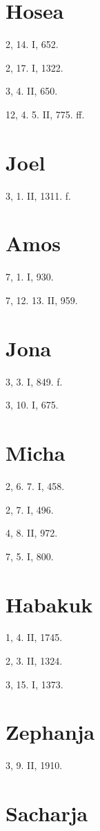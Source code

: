 \section{Hosea}

2, 14. I, 652.

2, 17. I, 1322.

3, 4. II, 650.

12, 4. 5. II, 775. ff.

\section{Joel}

3, 1. II, 1311. f.

\section{Amos}

7, 1. I, 930.

7, 12. 13. II, 959.

\section{Jona}

3, 3. I, 849. f.

3, 10. I, 675.

\section{Micha}

2, 6. 7. I, 458.

2, 7. I, 496.

4, 8. II, 972.

7, 5. I, 800.

\section{Habakuk}

1, 4. II, 1745.

2, 3. II, 1324.

3, 15. I, 1373.

\section{Zephanja}

3, 9. II, 1910.

\section{Sacharja}

